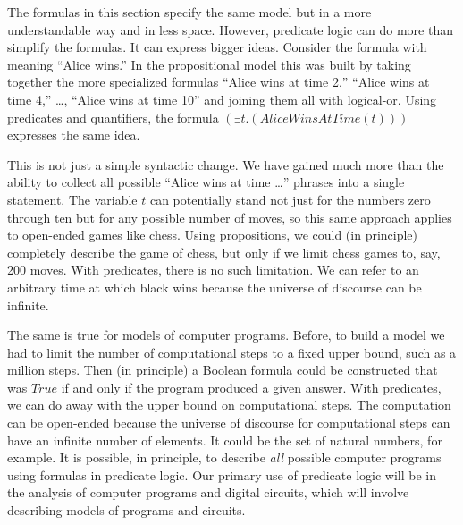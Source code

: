 {{The formulas in this section specify the same model but in a more understandable
way and in less space.
However, predicate logic can do more than simplify the formulas.
It can express bigger ideas.
Consider the formula with meaning ``Alice wins.''
In the propositional model this was built by taking together the more specialized formulas
``Alice wins at time 2,'' ``Alice wins at time 4,'' \dots, ``Alice wins at time 10''
and joining them all with logical-or.
Using predicates and quantifiers, the formula $(\exists t.(AliceWinsAtTime(t)))$ expresses
the same idea.

This is not just a simple syntactic change.
We have gained much more than the ability to
collect all possible ``Alice wins at time \dots'' phrases into a single statement.
The variable $t$ can potentially stand not just for the numbers zero through ten
but for any possible number of moves, so
this same approach applies to open-ended games like chess.
Using propositions, we could (in principle)
completely describe the game of chess, but only if we limit chess games to, say, 200 moves.
With predicates, there is no such limitation.
We can refer to an arbitrary time at which black wins because the universe of discourse
can be infinite.

The same is true for models of computer programs.
Before, to build a model we had to limit the number of computational steps to a fixed upper bound,
such as a million steps.
Then (in principle)
a Boolean formula could be constructed that was $True$
if and only if the program produced a given answer.
With predicates, we can do away with the upper bound on computational steps.
The computation can be open-ended because the universe of discourse for computational steps
can have an infinite number of elements. It could be the set of natural numbers, for example.
It is possible, in principle, to describe \emph{all} possible computer programs
using formulas in predicate logic.
Our primary use of predicate logic will be in the analysis of
computer programs and digital circuits,
which will involve describing models of programs and circuits.


}}
